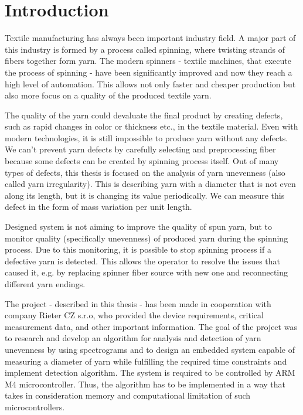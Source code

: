 \documentclass[twoside]{ctuthesis}
\theoremstyle{plain}
\theoremstyle{definition}
\theoremstyle{note}
\begin{document}
	
\maketitle

\chapter{Introduction}
Textile manufacturing has always been important industry field. A major part of this industry is formed by a process called spinning, where twisting strands of fibers together form yarn. The modern spinners - textile machines, that execute the process of spinning - have been significantly improved and now they reach a high level of automation. This allows not only faster and cheaper production but also more focus on a quality of the produced textile yarn. 

The quality of the yarn could devaluate the final product by creating defects, such as rapid changes in color or thickness etc., in the textile material. Even with modern technologies, it is still impossible to produce yarn without any defects. We can't prevent yarn defects by carefully selecting and preprocessing fiber because some defects can be created by spinning process itself. Out of many types of defects, this thesis is focused on the analysis of yarn unevenness (also called yarn irregularity). This is describing yarn with a diameter that is not even along its length, but it is changing its value periodically. We can measure this defect in the form of mass variation per unit length.

Designed system is not aiming to improve the quality of spun yarn, but to monitor quality (specifically unevenness) of produced yarn during the spinning process. Due to this monitoring, it is possible to stop spinning process if a defective yarn is detected. This allows the operator to resolve the issues that caused it, e.g. by replacing spinner fiber source with new one and reconnecting different yarn endings.

The project - described in this thesis - has been made in cooperation with company Rieter CZ s.r.o, who provided the device requirements, critical measurement data, and other important information. The goal of the project was to research and develop an algorithm for analysis and detection of yarn unevenness by using spectrograms and to design an embedded system capable of measuring a diameter of yarn while fulfilling the required time constraints and implement detection algorithm. The system is required to be controlled by ARM M4 microcontroller. Thus, the algorithm has to be implemented in a way that takes in consideration memory and computational limitation of such microcontrollers.
\end{document}
